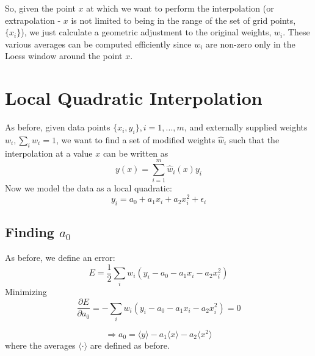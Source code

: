 \documentclass[oneside]{tufte-handout}
\begin{document}
\begin{fullwidth}
So, given the point $x$ at which we want to perform the interpolation (or extrapolation - $x$ is not limited to being in the range of the set of grid points, $\{x_i\}$), we just calculate a geometric adjustment to the original weights, $w_i$. These various averages can be computed efficiently since $w_i$ are non-zero only in the Loess window around the point $x$.

\section{Local Quadratic Interpolation}
As before, given data points $\{x_i, y_i\}, i = 1, ..., m$, and externally supplied weights $w_i, \sum_i w_i = 1$, we want to find a set of modified weights $\hat{w}_i$ such that the interpolation at a value $x$ can be written as
\begin{equation*}
y(x) = \sum_{i=1}^m \hat{w}_i(x) y_i
\end{equation*}
Now we model the data as a local quadratic:
\begin{equation*}
y_i = a_0 + a_1 x_i + a_2 x_i^2 + \epsilon_i
\end{equation*}

\subsection{Finding $a_0$}
As before, we define an error:
\begin{equation*}
E = \frac{1}{2} \sum_i w_i (y_i - a_0 - a_1 x_i - a_2 x_i^2)
\end{equation*}
Minimizing
\begin{equation*}
\frac{\partial E}{\partial a_0} = - \sum_i w_i (y_i - a_0 - a_1 x_i - a_2 x_i^2) = 0
\end{equation*}

\begin{equation*}
\Rightarrow a_0 = \langle y \rangle - a_1 \langle x \rangle - a_2 \langle x^2 \rangle
\end{equation*}
where the averages $\langle \cdot \rangle$ are defined as before.


\end{fullwidth}
\end{document}
